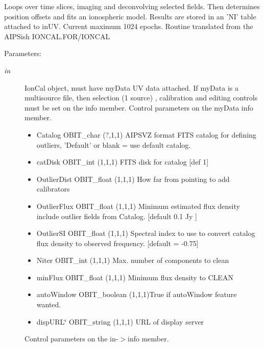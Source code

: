 Loops over time slices, imaging and deconvolving selected fields. Then determines position offsets and fits an ionospheric model. Results are stored in an 'NI' table attached to in\-UV. Current maximum 1024 epochs. Routine translated from the AIPSish IONCAL.FOR/IONCAL \begin{Desc}
\item[Parameters:]
\begin{description}
\item[{\em in}]Ion\-Cal object, must have my\-Data UV data attached. If my\-Data is a multisource file, then selection (1 source) , calibration and editing controls must be set on the info member. Control parameters on the my\-Data info member. \begin{itemize}
\item Catalog OBIT\_\-char (?,1,1) AIPSVZ format FITS catalog for defining outliers, 'Default' or blank = use default catalog. \item cat\-Disk OBIT\_\-int (1,1,1) FITS disk for catalog [def 1] \item Outlier\-Dist OBIT\_\-float (1,1,1) How far from pointing to add calibrators \item Outlier\-Flux OBIT\_\-float (1,1,1) Minimum estimated flux density include outlier fields from Catalog. [default 0.1 Jy ] \item Outlier\-SI OBIT\_\-float (1,1,1) Spectral index to use to convert catalog flux density to observed frequency. [default = -0.75] \item Niter OBIT\_\-int (1,1,1) Max. number of components to clean \item min\-Flux OBIT\_\-float (1,1,1) Minimum flux density to CLEAN \item auto\-Window OBIT\_\-boolean (1,1,1)True if auto\-Window feature wanted. \item disp\-URL\char`\"{} OBIT\_\-string (1,1,1) URL of display server\end{itemize}
Control parameters on the in-$>$info member. \begin{itemize}

\end{itemize}
\end{description}
\end{Desc}
